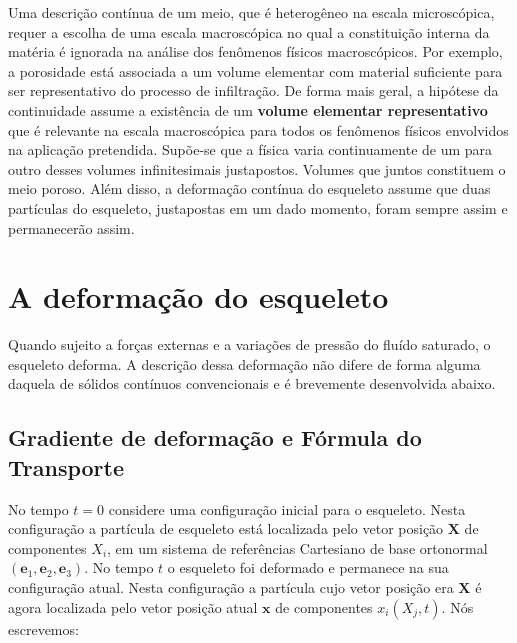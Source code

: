 \documentclass[
	11pt, %
	fleqn, %
	a4paper, %
]{LegrandOrangeBook}
\begin{document}
Uma descrição contínua de um meio, que é heterogêneo na escala microscópica, requer a escolha de uma escala macroscópica no qual a constituição interna da matéria é ignorada na análise dos fenômenos físicos macroscópicos. Por exemplo, a porosidade está associada a um volume elementar com material suficiente para ser representativo do processo de infiltração. De forma mais geral, a hipótese da continuidade assume a existência de um \textbf{volume elementar representativo} que é relevante na escala macroscópica para todos os fenômenos físicos envolvidos na aplicação pretendida. Supõe-se que a física varia continuamente de um para outro desses volumes infinitesimais justapostos. Volumes que juntos constituem o meio poroso. Além disso, a deformação contínua do esqueleto assume que duas partículas do esqueleto, justapostas em um dado momento, foram sempre assim e permanecerão assim. 

\section{A deformação do esqueleto}

Quando sujeito a forças externas e a variações de pressão do fluído saturado, o esqueleto deforma. A descrição dessa deformação não difere de forma alguma daquela de sólidos contínuos convencionais e é brevemente desenvolvida abaixo.



\subsection{Gradiente de deformação e Fórmula do Transporte}


\newcommand{\Fll}{\textbf{F}}
\newcommand{\Nl}{\textbf{N}}
\newcommand{\nl}{\textbf{n}}
\newcommand{\dl}{\textbf{d}}
\newcommand{\Rll}{\textbf{R}}
\newcommand{\Tll}{\textbf{T}}
\newcommand{\Dll}{\textbf{D}}
\newcommand{\Ul}{\textbf{U}}
\newcommand{\Xl}{\textbf{X}}
\newcommand{\Yl}{\textbf{Y}}
\newcommand{\Xil}{\bm{\xi}}
\newcommand{\strainll}{\bm{\varepsilon}}
\newcommand{\Omegall}{\bm{\Omega}}
\newcommand{\omegal}{\bm{\omega}}
\newcommand{\gammal}{\bm{\gamma}}
\newcommand{\xl}{\textbf{x}}
\newcommand{\yl}{\textbf{y}}
\newcommand{\el}{\textbf{e}}
\newcommand{\onell}{\bm{1}}
\newcommand{\vl}{\textbf{v}}
\newcommand{\Vl}{\textbf{V}}
\newcommand{\Deltall}{\bm{\Delta}}

No tempo $t=0$ considere uma configuração inicial para o esqueleto. Nesta configuração a partícula de esqueleto está localizada pelo vetor posição $\Xl$ de componentes $X_i$, em um sistema de referências Cartesiano de base ortonormal $(\el_1, \el_2, \el_3)$. No tempo $t$ o esqueleto foi deformado e permanece na sua configuração atual. Nesta configuração a partícula cujo vetor posição era $\Xl$ é agora localizada pelo vetor posição atual $\xl$ de componentes $x_i(X_j,t)$. Nós escrevemos:
\end{document}
